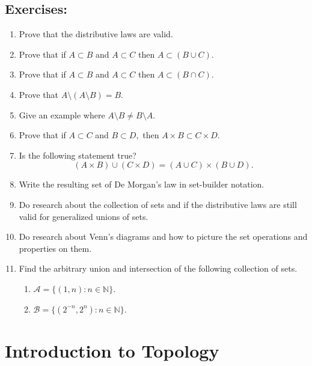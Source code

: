\documentclass[
	fontsize=10pt, %
	twoside=false, %
	secnumdepth=1, %
]{kaobook}
\begin{document}
\section{Exercises:}

\begin{enumerate}
\item Prove that the distributive laws are valid. 

\item Prove that if $A\subset B$ and $A\subset C$ then $A\subset (B\cup C).$

\item Prove that if $A\subset B$ and $A\subset C$ then $A\subset (B\cap C).$

\item Prove that $A\setminus (A\setminus B)= B.$

\item Give an example where $A\setminus B \neq B\setminus A.$

\item Prove that if $A\subset C$ and $B\subset D,$ then $A\times B \subset C\times D.$

\item Is the following statement true? $$(A\times B)\cup (C\times D)=(A\cup C)\times (B\cup D).$$

\item Write the resulting set of De Morgan's law in set-builder notation.

\item Do research about the collection of sets and if the distributive laws are still valid for generalized unions of sets.

\item Do research about Venn's diagrams and how to picture the set operations and properties on them.

\item Find the arbitrary union and intersection of the following collection of sets.
\begin{enumerate}
\item $\mathcal{A}=\{(1,n): n\in \mathbb{N}\}.$
\item $\mathcal{B}=\{(2^{-n},2^{n}):n\in \mathbb{N}\}.$
\end{enumerate}
\end{enumerate}
\chapter{Introduction to Topology}
\end{document}
